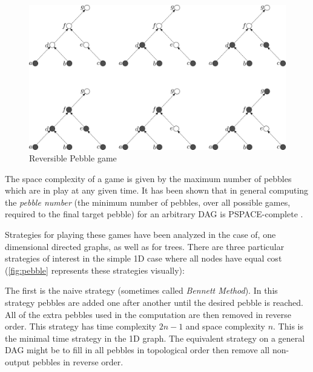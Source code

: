 \begin{figure}
      \capstart
      \centering
      \includegraphics[width=0.9\hsize]{images/rev-peb-game}
      \caption{Reversible Pebble game}
      \label{fig:rev-peb-game}
\end{figure}

The space complexity of a game is given by the maximum number of pebbles which
are in play at any given time. It has been shown that in general computing the
\emph{pebble number} (the minimum number of pebbles, over all possible games,
required to the final target pebble) for an arbitrary DAG is
PSPACE-complete\cite{chan13} .

Strategies for playing these games have been analyzed in the case of, one
dimensional directed graphs, as well as for trees\cite{peb16}.  There are three
particular strategies of interest in the simple 1D case where all nodes have
equal cost (\cref{fig:pebble} represents these strategies visually):

The first is the naive strategy (sometimes called \emph{Bennett Method}). In
this strategy pebbles are added one after another until the desired pebble is
reached.  All of the extra pebbles used in the computation are then removed in
reverse order. This strategy has time complexity $2n-1$ and space complexity
$n$. This is the minimal time strategy in the 1D graph. The equivalent strategy
on a general DAG might be to fill in all pebbles in topological order then
remove all non-output pebbles in reverse order.

